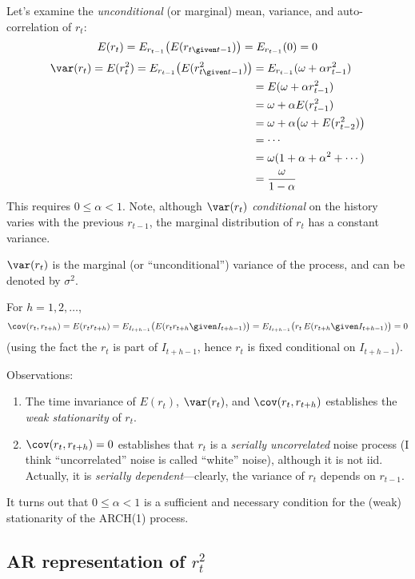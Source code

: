 \documentclass[12pt]{article}
\begin{document}
Let's examine the
\emph{unconditional} (or marginal)
mean, variance, and auto-correlation of $r_t$:
\[
E(r_t)
= E_{r_{t-1}}\bigl(E(r_{t \given t-1})\bigr)
= E_{r_{t-1}}(0)
= 0
\]
\[\begin{split}
\var(r_t)
= E(r_t^2)
= E_{r_{t-1}}\bigl(
    E(r_{t\given t-1}^2)
    \bigr)
&= E_{r_{t-1}}(\omega + \alpha r_{t-1}^2)
\\
&= E(\omega + \alpha r_{t-1}^2)
\\
&= \omega + \alpha E(r_{t-1}^2)
\\
&= \omega + \alpha \bigl(\omega + E(r_{t-2}^2)\bigr)
\\
&= \dotsb
\\
&= \omega (1 + \alpha + \alpha^2 + \dotsb)
\\
&= \frac{\omega}{1 - \alpha}
\end{split}
\]
This requires $0 \le \alpha < 1$.
Note,
although $\var(r_t)$ \emph{conditional} on the history
varies with the previous $r_{t-1}$,
the marginal distribution of $r_t$ has a constant variance.

$\var(r_t)$ is the marginal (or ``unconditional'') variance
of the process, and can be denoted by $\sigma^2$.

For $h =1,2,\dotsc$,
\[
\cov(r_t, r_{t+h})
= E(r_t r_{t+h})
= E_{I_{t+h-1}}\bigl(E(r_t r_{t+h} \given I_{t+h-1})\bigr)
= E_{I_{t+h-1}}\bigl(r_t\, E(r_{t+h} \given I_{t+h-1})\bigr)
= 0
\]
(using the fact the $r_t$ is part of $I_{t+h-1}$,
hence $r_t$ is fixed conditional on $I_{t+h-1}$).

Observations:
\begin{enumerate}
\item
The time invariance of $E(r_t)$, $\var(r_t)$,
and $\cov(r_t, r_{t+h})$
establishes the \emph{weak stationarity} of $r_t$.
\item
$\cov(r_t, r_{t+h}) = 0$ establishes that
$r_t$ is a \emph{serially uncorrelated} noise process
(I think ``uncorrelated'' noise is called ``white'' noise),
although it is not iid.
Actually, it is \emph{serially dependent}---clearly,
the variance of $r_t$ depends on $r_{t-1}$.
\end{enumerate}

It turns out that $0 \le \alpha < 1$
is a sufficient and necessary condition for the
(weak) stationarity of the ARCH(1) process.

\subsection{AR representation of $r_t^2$}
\end{document}
